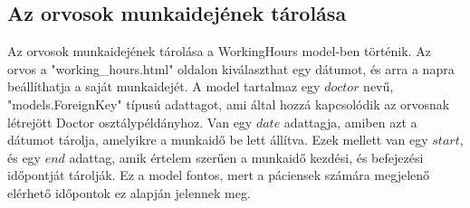 \subsection{Az orvosok munkaidejének tárolása}

Az orvosok munkaidejének tárolása a WorkingHours model-ben történik. Az orvos a "working\_hours.html" oldalon kiválaszthat egy dátumot, és arra a napra beállíthatja a saját munkaidejét. A model tartalmaz egy $doctor$ nevű, "models.ForeignKey" típusú adattagot, ami által hozzá kapcsolódik az orvosnak létrejött Doctor osztálypéldányhoz. Van egy $date$ adattagja, amiben azt a dátumot tárolja, amelyikre a munkaidő be lett állítva. Ezek mellett van egy $start$, és egy $end$ adattag, amik értelem szerűen a munkaidő kezdési, és befejezési időpontját tárolják. Ez a model fontos, mert a páciensek számára megjelenő elérhető időpontok ez alapján jelennek meg.

